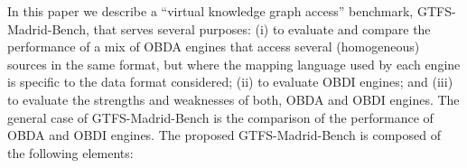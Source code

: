 In this paper we describe a ``virtual knowledge graph access'' benchmark, GTFS-Madrid-Bench, that serves several purposes: (i) to evaluate and compare the performance of a mix of OBDA engines that access several (homogeneous) sources in the same format, but where the mapping language used by each engine is specific to the data format considered; (ii) to evaluate OBDI engines; and (iii) to evaluate the strengths and weaknesses of both, OBDA and OBDI engines. The general case of GTFS-Madrid-Bench is the comparison of the performance of OBDA and OBDI engines. The proposed GTFS-Madrid-Bench is composed of the following elements:

\begin{table}
\centering
\caption[Caption]{Most commonly used formats (and percentage over the total number of datasets) to publish data in mature EU open data portals\footnotemark}
\label{tab:odp}
\end{table}




